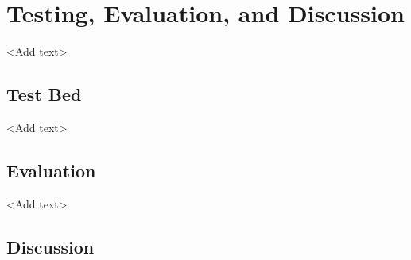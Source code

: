 \chapter{Testing, Evaluation, and Discussion}

<Add text>

\section{Test Bed}

<Add text>

\section{Evaluation}

<Add text>

\section{Discussion}